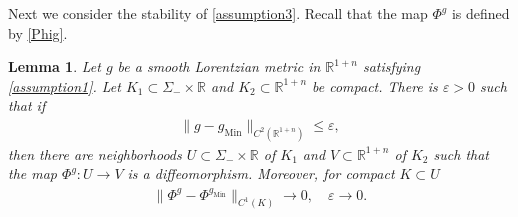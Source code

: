 \documentclass[11pt,letterpaper]{amsart}
\newtheorem{Lemma}[Theorem]{Lemma}
\theoremstyle{definition}
\numberwithin{equation}{section}
\newcommand{\mR}{\mathbb{R}}                    %
\newcommand{\norm}[1]{\lVert #1 \rVert}         %
\newcommand{\eps}{\varepsilon}
\newcommand{\gm}{g_{\mathrm{Min}}}
\def\R{\mathbb R}
\begin{document}
Next we consider the stability of \eqref{assumption3}. Recall that the map $\Phi^g$ is defined by \eqref{Phig}.

\begin{Lemma}\label{lem_simple_near_Min}
Let $g$ be a smooth Lorentzian metric in $\mR^{1+n}$ satisfying \eqref{assumption1}. Let $K_1 \subset \Sigma_- \times \R$ and $K_2 \subset \R^{1+n}$ be compact. There is $\eps > 0$ such that if
\begin{gather*}
\norm{g-\gm}_{C^2(\R^{1+n})} \le \eps,
\end{gather*}
then there are neighborhoods $U \subset \Sigma_- \times \R$ of $K_1$ 
and $V \subset \R^{1+n}$ of $K_2$ such that the map
$\Phi^g : U \to V$ 
is a diffeomorphism. Moreover, for compact $K \subset U$
    \begin{align*}
\norm{\Phi^g - \Phi^{\gm}}_{C^1(K)} \to 0, \quad \eps \to 0.
    \end{align*}
\end{Lemma}
\end{document}
